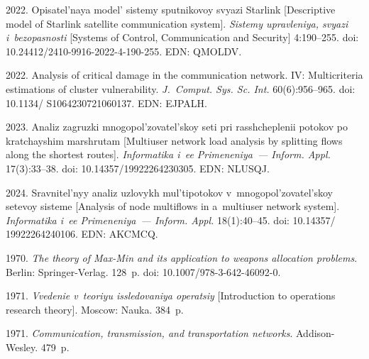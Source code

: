   \begin{multicols}{2}

\renewcommand{\bibname}{\protect\rmfamily References}

{\small\frenchspacing
 {%
 \begin{thebibliography}{99} 
    
 2022. 
Opisatel'naya model' sistemy sputnikovoy svyazi Starlink [Descriptive model of Starlink satellite communication system].
\textit{Sistemy upravleniya, svyazi i~bezopas\-nosti} [Systems of Control, Communication and Security] 4:190--255.
doi: 10.24412/2410-9916-2022-4-190-255. EDN: QMOLDV.

 2022.
Analysis of critical damage in the communication network. IV: Multicriteria estimations of cluster vulnerability.
\textit{J.~Comput. Sys. Sc. Int.} 60(6):956--965.
doi: 10.1134/ S1064230721060137. EDN: EJPALH.



 2023.  
Analiz zagruzki  mnogopol'zovatel'skoy seti pri rasshcheplenii potokov po kratchayshim marshrutam 
[Multiuser network load analysis by splitting flows along the shortest routes]. 
\textit{Informatika i~ee Primeneniya~--- Inform. Appl.} 17(3):33--38.
doi: 10.14357/19922264230305. EDN: NLUSQJ.

 2024. 
Srav\-ni\-tel'\-nyy analiz uz\-lo\-vykh mul'\-ti\-po\-to\-kov v~mno\-go\-pol'\-zo\-va\-tel'\-skoy se\-te\-voy sis\-te\-me 
[Analysis of node multiflows in \mbox{a~multiuser} network system].
\textit{Informatika i~ee Primeneniya~--- Inform. Appl.} 18(1):40--45.
doi: 10.14357/ 19922264240106. EDN: AKCMCQ.




 1970.
\textit{The theory of Max-Min and its application to weapons allocation problems}. Berlin: Springer-Verlag. 128~p. 
doi: 10.1007/978-3-642-46092-0.

 1971.
\textit{Vvedenie v~teoriyu issledovaniya operatsiy} [Introduction to operations research theory]. Moscow: Nauka. 384~p.

 1971. 
\textit{Communication, transmission, and transportation networks}. Addison-Wesley. 479~p.   



\end{thebibliography}}}
\end{multicols}
